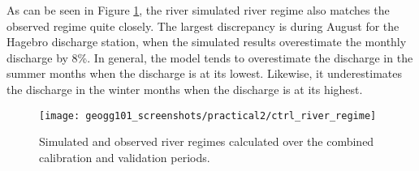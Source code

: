 \documentclass{article}
\begin{document}
\begin{table}[!h]
    \centering
\end{table}

As can be seen in Figure \ref{fig:ctrl_river_regime}, the river simulated river regime also matches the observed regime quite closely. The largest discrepancy is during August for the Hagebro discharge station, when the simulated results overestimate the monthly discharge by 8\%. In general, the model tends to overestimate the discharge in the summer months when the discharge is at its lowest. Likewise, it underestimates the discharge in the winter months when the discharge is at its highest.

\begin{figure}[!h]
    \centering
    \texttt{[image: geogg101\_screenshots/practical2/ctrl\_river\_regime]}
    \caption{Simulated and observed river regimes calculated over the combined calibration and validation periods.}
    \label{fig:ctrl_river_regime}
\end{figure}


\newpage
\end{document}
